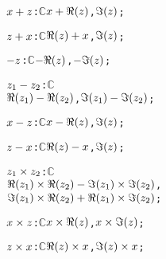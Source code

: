 \begin{alltt}
  \(\opplustwofn{x}{z}\): \(\mathbb{C}\) \pvskey{=} \pvsid{(}\(\opplustwofn{x}{\Reonefn{z}}\), \(\Imonefn{z}\)\pvsid{)};\vspace*{\pvsdeclspacing}

  \(\opplustwofn{z}{x}\): \(\mathbb{C}\) \pvskey{=} \pvsid{(}\(\opplustwofn{\Reonefn{z}}{x}\), \(\Imonefn{z}\)\pvsid{)};\vspace*{\pvsdeclspacing}

  \(\opdifferenceonefn{z}\): \(\mathbb{C}\) \pvskey{=} \pvsid{(}\(\opdifferenceonefn{\Reonefn{z}}\), \(\opdifferenceonefn{\Imonefn{z}}\)\pvsid{)};\vspace*{\pvsdeclspacing}

  \(\opdifferencetwofn{z\sb{1}}{z\sb{2}}\): \(\mathbb{C}\) \pvskey{=}
      \pvsid{(}\(\opdifferencetwofn{\Reonefn{z\sb{1}}}{\Reonefn{z\sb{2}}}\), \(\opdifferencetwofn{\Imonefn{z\sb{1}}}{\Imonefn{z\sb{2}}}\)\pvsid{)};\vspace*{\pvsdeclspacing}

  \(\opdifferencetwofn{x}{z}\): \(\mathbb{C}\) \pvskey{=} \pvsid{(}\(\opdifferencetwofn{x}{\Reonefn{z}}\), \(\Imonefn{z}\)\pvsid{)};\vspace*{\pvsdeclspacing}

  \(\opdifferencetwofn{z}{x}\): \(\mathbb{C}\) \pvskey{=} \pvsid{(}\(\opdifferencetwofn{\Reonefn{z}}{x}\), \(\Imonefn{z}\)\pvsid{)};\vspace*{\pvsdeclspacing}

  \(\optimestwofn{z\sb{1}}{z\sb{2}}\): \(\mathbb{C}\) \pvskey{=}
      \pvsid{(}\(\opdifferencetwofn{\optimestwofn{\Reonefn{z\sb{1}}}{\Reonefn{z\sb{2}}}}{\optimestwofn{\Imonefn{z\sb{1}}}{\Imonefn{z\sb{2}}}}\),
                \(\opplustwofn{\optimestwofn{\Imonefn{z\sb{1}}}{\Reonefn{z\sb{2}}}}{\optimestwofn{\Reonefn{z\sb{1}}}{\Imonefn{z\sb{2}}}}\)\pvsid{)};\vspace*{\pvsdeclspacing}

  \(\optimestwofn{x}{z}\): \(\mathbb{C}\) \pvskey{=} \pvsid{(}\(\optimestwofn{x}{\Reonefn{z}}\), \(\optimestwofn{x}{\Imonefn{z}}\)\pvsid{)};\vspace*{\pvsdeclspacing}

  \(\optimestwofn{z}{x}\): \(\mathbb{C}\) \pvskey{=} \pvsid{(}\(\optimestwofn{\Reonefn{z}}{x}\), \(\optimestwofn{\Imonefn{z}}{x}\)\pvsid{)};\vspace*{\pvsdeclspacing}


\end{alltt}
